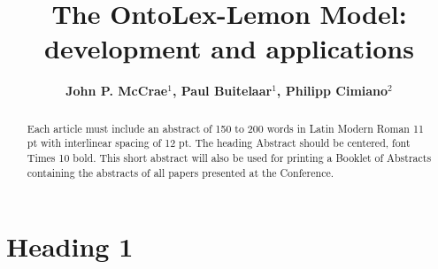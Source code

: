 \documentclass[12pt,a4paper]{elex2017}
\begin{document}
\mainmatter
\title{The OntoLex-Lemon Model: development and applications}
\author{\bf John P. McCrae$^1$, Paul Buitelaar$^1$, Philipp Cimiano$^{2}$}

\maketitle

\begin{abstract}
Each article must include an abstract of 150 to 200 words in Latin Modern Roman
11 pt with interlinear spacing of 12 pt. The heading Abstract should be
centered, font Times 10 bold. This short abstract will also be used for
printing a Booklet of Abstracts containing the abstracts of all papers
    presented at the Conference.

\end{abstract}

\section{Heading 1}
\end{document}
